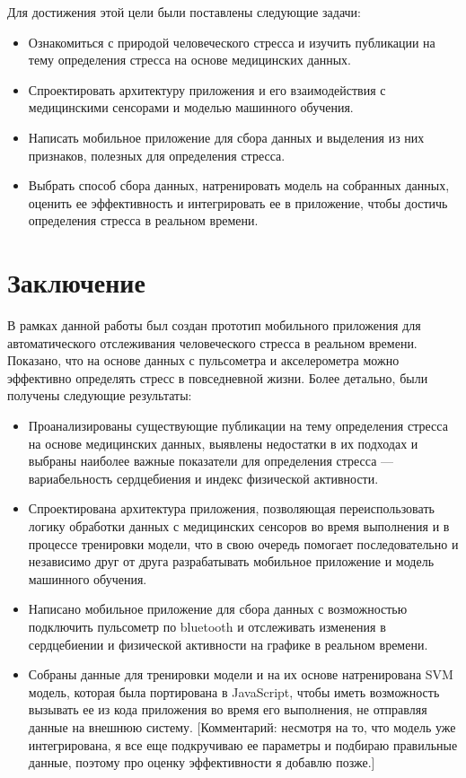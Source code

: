 \documentclass[14pt]{matmex-diploma-custom}
\begin{document}
Для достижения этой цели были поставлены следующие задачи:

\begin{itemize}
\item Ознакомиться с природой человеческого стресса и изучить публикации на тему
  определения стресса на основе медицинских данных.
\item Спроектировать архитектуру приложения и его взаимодействия с медицинскими
  сенсорами и моделью машинного обучения.
\item Написать мобильное приложение для сбора данных и выделения из них
  признаков, полезных для определения стресса.
\item Выбрать способ сбора данных, натренировать модель на собранных данных,
  оценить ее эффективность и интегрировать ее в приложение, чтобы достичь
  определения стресса в реальном времени.
\end{itemize}

\section*{Заключение}
В рамках данной работы был создан прототип мобильного приложения для
автоматического отслеживания человеческого стресса в реальном времени. Показано,
что на основе данных с пульсометра и акселерометра можно эффективно определять
стресс в повседневной жизни. Более детально, были получены следующие результаты:

\begin{itemize}
\item Проанализированы существующие публикации на тему определения
  стресса на основе медицинских данных, выявлены недостатки в их подходах и
  выбраны наиболее важные показатели для определения стресса — вариабельность
  сердцебиения и индекс физической активности.
\item Спроектирована архитектура приложения, позволяющая переиспользовать логику
  обработки данных с медицинских сенсоров во время выполнения и в процессе
  тренировки модели, что в свою очередь помогает последовательно и независимо
  друг от друга разрабатывать мобильное приложение и модель машинного обучения.
\item Написано мобильное приложение для сбора данных с возможностью подключить
  пульсометр по bluetooth и отслеживать изменения в сердцебиении и физической
  активности на графике в реальном времени.
\item Собраны данные для тренировки модели и на их основе натренирована SVM
  модель, которая была портирована в JavaScript, чтобы иметь возможность
  вызывать ее из кода приложения во время его выполнения, не отправляя данные на
  внешнюю систему. [Комментарий: несмотря на то, что модель уже интегрирована, я
  все еще подкручиваю ее параметры и подбираю правильные данные, поэтому про
  оценку эффективности я добавлю позже.]
\end{itemize}

\setmonofont[Mapping=tex-text]{CMU Typewriter Text}
 
\end{document}
